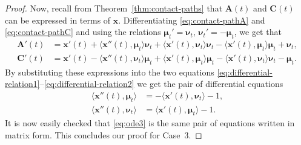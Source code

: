 \documentclass[11pt]{article}
\newcommand{\nvecone}{\boldsymbol{\mu}}
\newcommand{\nvectwo}{\boldsymbol{\nu}}
\begin{document}
\begin{proof}
Now, recall from Theorem~\ref{thm:contact-paths} that $\mathbf{A}(t)$ and $\mathbf{C}(t)$ can be expressed in terms of $\mathbf{x}$. Differentiating \eqref{eq:contact-pathA} and \eqref{eq:contact-pathC} and using the relations $\nvecone_t'=\nvectwo_t$, $\nvectwo_t'=-\nvecone_t$, we get that
\begin{align*}
\mathbf{A}'(t) &= \mathbf{x}'(t) + \Big\langle \mathbf{x}''(t),\nvecone_t \Big\rangle \nvectwo_t + \Big\langle \mathbf{x}'(t), \nvectwo_t \Big\rangle \nvectwo_t - \Big\langle \mathbf{x}'(t), \nvecone_t \Big\rangle \nvecone_t + \nvectwo_t, \\
\mathbf{C}'(t) &= \mathbf{x}'(t) - \Big\langle \mathbf{x}''(t),\nvectwo_t \Big\rangle \nvecone_t + \Big\langle \mathbf{x}'(t), \nvecone_t \Big\rangle \nvecone_t - \Big\langle \mathbf{x}'(t), \nvectwo_t \Big\rangle \nvectwo_t - \nvecone_t.
\end{align*}
By substituting these expressions into the two equations 
\eqref{eq:differential-relation1}--\eqref{eq:differential-relation2} we get the pair of differential equations
\begin{align*}
\Big\langle \mathbf{x}''(t), \nvecone_t \Big\rangle &= -\Big\langle \mathbf{x}'(t), \nvectwo_t \Big\rangle -1, \\
\Big\langle \mathbf{x}''(t), \nvectwo_t \Big\rangle &= \Big\langle \mathbf{x}'(t), \nvecone_t \Big\rangle -1.
\end{align*}
It is now easily checked that \eqref{eq:ode3} is the same pair of equations written in matrix form.
This concludes our proof for Case~3.


\end{proof}
\end{document}
